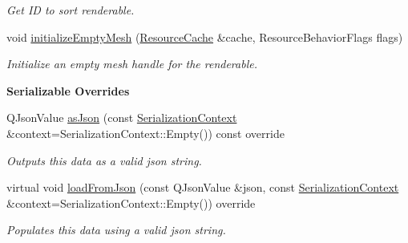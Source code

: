 \begin{Indent}
\begin{DoxyCompactItemize}
\begin{DoxyCompactList}\small\item\em Get ID to sort renderable. \end{DoxyCompactList}\item 
\mbox{\label{classrev_1_1_renderable_a3f1c9e3482bf07c4701b99980359c726}} 
void \mbox{\hyperlink{classrev_1_1_renderable_a3f1c9e3482bf07c4701b99980359c726}{initialize\+Empty\+Mesh}} (\mbox{\hyperlink{classrev_1_1_resource_cache}{Resource\+Cache}} \&cache, Resource\+Behavior\+Flags flags)
\begin{DoxyCompactList}\small\item\em Initialize an empty mesh handle for the renderable. \end{DoxyCompactList}\end{DoxyCompactItemize}
\end{Indent}
\begin{Indent}\textbf{ Serializable Overrides}\par
\begin{DoxyCompactItemize}
\item 
\mbox{\label{classrev_1_1_renderable_a4c49eec6b82ea4c882f2353c84ea4d7d}} 
Q\+Json\+Value \mbox{\hyperlink{classrev_1_1_renderable_a4c49eec6b82ea4c882f2353c84ea4d7d}{as\+Json}} (const \mbox{\hyperlink{structrev_1_1_serialization_context}{Serialization\+Context}} \&context=Serialization\+Context\+::\+Empty()) const override
\begin{DoxyCompactList}\small\item\em Outputs this data as a valid json string. \end{DoxyCompactList}\item 
\mbox{\label{classrev_1_1_renderable_adb5db6c93ccc90765b18d160b9226164}} 
virtual void \mbox{\hyperlink{classrev_1_1_renderable_adb5db6c93ccc90765b18d160b9226164}{load\+From\+Json}} (const Q\+Json\+Value \&json, const \mbox{\hyperlink{structrev_1_1_serialization_context}{Serialization\+Context}} \&context=Serialization\+Context\+::\+Empty()) override
\begin{DoxyCompactList}\small\item\em Populates this data using a valid json string. \end{DoxyCompactList}\end{DoxyCompactItemize}
\end{Indent}

